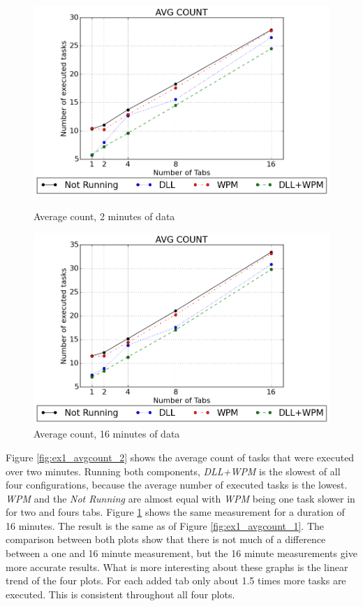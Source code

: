 \begin{figure}[!htbp]
	\centering
    \includegraphics[width=\textwidth,height=0.45\textheight,keepaspectratio]{Evaluation/experiment1/AVG-COUNT-2.png}
    \caption{Average count, 2 minutes of data}
    \label{fig:ex1_avgcount_2}

  	\vspace*{\floatsep}
  	
    \includegraphics[width=\textwidth,height=0.45\textheight,keepaspectratio]{Evaluation/experiment1/AVG-COUNT-16.png}
    \caption{Average count, 16 minutes of data}
    \label{fig:ex1_avgcount_16}
\end{figure}
Figure \ref{fig:ex1_avgcount_2} shows the average count of tasks that were executed over two minutes. Running both components, \emph{\gls{DLL}+\gls{WPM}} is the slowest of all four configurations, because the average number of executed tasks is the lowest. \emph{WPM} and the \emph{Not Running} are almost equal with \emph{\gls{WPM}} being one task slower in for two and fours tabs. Figure \ref{fig:ex1_avgcount_16} shows the same measurement for a duration of 16 minutes. The result is the same as of Figure \ref{fig:ex1_avgcount_1}. The comparison between both plots show that there is not much of a difference between a one and 16 minute measurement, but the 16 minute measurements give more accurate results. What is more interesting about these graphs is the linear trend of the four plots. For each added tab only about 1.5 times more tasks are executed. This is consistent throughout all four plots.
